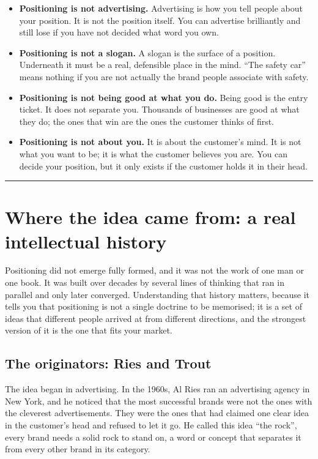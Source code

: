 \documentclass[10pt,twoside,openany]{memoir}
\newcommand{\needspacehead}{\needspace{4\baselineskip}}
\let\oldsection\section
\renewcommand{\section}{\needspacehead\oldsection}
\begin{document}
\begin{itemize}
\tightlist
\item
  \textbf{Positioning is not advertising.} Advertising is how you tell
  people about your position. It is not the position itself. You can
  advertise brilliantly and still lose if you have not decided what word
  you own.
\item
  \textbf{Positioning is not a slogan.} A slogan is the surface of a
  position. Underneath it must be a real, defensible place in the mind.
  ``The safety car'' means nothing if you are not actually the brand
  people associate with safety.
\item
  \textbf{Positioning is not being good at what you do.} Being good is
  the entry ticket. It does not separate you. Thousands of businesses
  are good at what they do; the ones that win are the ones the customer
  thinks of first.
\item
  \textbf{Positioning is not about you.} It is about the customer's
  mind. It is not what you want to be; it is what the customer believes
  you are. You can decide your position, but it only exists if the
  customer holds it in their head.
\end{itemize}

\begin{center}\rule{0.5\linewidth}{0.5pt}\end{center}

\FloatBarrier
\chapter{Where the idea came from: a real intellectual
history}\label{where-the-idea-came-from-a-real-intellectual-history}

Positioning did not emerge fully formed, and it was not the work of one
man or one book. It was built over decades by several lines of thinking
that ran in parallel and only later converged. Understanding that
history matters, because it tells you that positioning is not a single
doctrine to be memorised; it is a set of ideas that different people
arrived at from different directions, and the strongest version of it is
the one that fits your market.

\section{The originators: Ries and
Trout}\label{the-originators-ries-and-trout}

The idea began in advertising. In the 1960s, Al Ries ran an advertising
agency in New York, and he noticed that the most successful brands were
not the ones with the cleverest advertisements. They were the ones that
had claimed one clear idea in the customer's head and refused to let it
go. He called this idea ``the rock'', every brand needs a solid rock to
stand on, a word or concept that separates it from every other brand in
its category.
\end{document}
